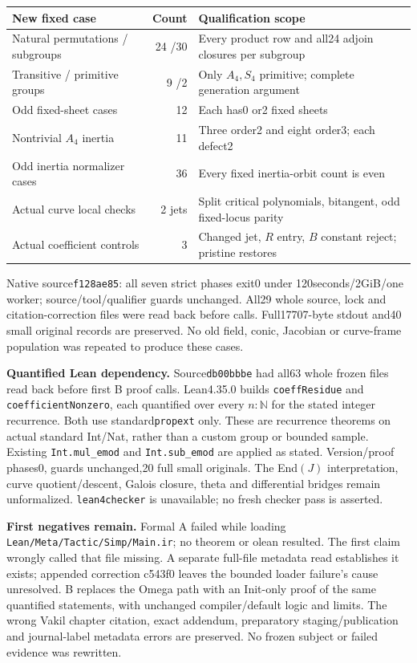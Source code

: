 \documentclass[10pt,a4paper]{article}
\begin{document}
\begin{center}
\begin{tabular}{>{\raggedright\arraybackslash}p{48mm}r>{\raggedright\arraybackslash}p{98mm}}
\toprule
New fixed case & Count & Qualification scope\\
\midrule
Natural permutations / subgroups &24 /30& Every product row and all24 adjoin closures per subgroup\\
Transitive / primitive groups &9 /2& Only $A_4,S_4$ primitive; complete generation argument\\
Odd fixed-sheet cases &12& Each has0 or2 fixed sheets\\
Nontrivial $A_4$ inertia &11& Three order2 and eight order3; each defect2\\
Odd inertia normalizer cases &36& Every fixed inertia-orbit count is even\\
Actual curve local checks &2 jets& Split critical polynomials, bitangent, odd fixed-locus parity\\
Actual coefficient controls &3& Changed jet, $R$ entry, $B$ constant reject; pristine restores\\
\bottomrule
\end{tabular}
\end{center}

Native source\texttt{f128ae85}: all seven strict phases exit0 under
120seconds/2GiB/one worker; source/tool/qualifier guards unchanged.
All29 whole source, lock and citation-correction files were read back
before calls. Full17707-byte stdout and40 small original records are
preserved. No old field, conic, Jacobian or curve-frame population was
repeated to produce these cases.

\textbf{Quantified Lean dependency.} Source\texttt{db00bbbe} had all63
whole frozen files read back before first B proof calls. Lean4.35.0
builds \texttt{coeffResidue} and \texttt{coefficientNonzero}, each
quantified over every $n:\mathbb N$ for the stated integer recurrence.
Both use standard\texttt{propext} only. These are recurrence theorems on
actual standard Int/Nat, rather than a custom group or bounded sample.
Existing \texttt{Int.mul\_emod} and \texttt{Int.sub\_emod} are applied
as stated. Version/proof phases0, guards unchanged,20 full small originals.
The End$(J)$ interpretation, curve quotient/descent, Galois closure,
theta and differential bridges remain unformalized.
\texttt{lean4checker} is unavailable; no fresh checker pass is asserted.

\textbf{First negatives remain.} Formal A failed while loading
\texttt{Lean/Meta/Tactic/Simp/Main.ir}; no theorem or olean resulted.
The first claim wrongly called that file missing. A separate full-file
metadata read establishes it exists; appended correction c543f0 leaves
the bounded loader failure's cause unresolved. B replaces the Omega
path with an Init-only proof of the same quantified statements, with
unchanged compiler/default logic and limits. The wrong Vakil chapter
citation, exact addendum, preparatory staging/publication and journal-label
metadata errors are preserved. No frozen subject or failed evidence
was rewritten.
\end{document}
